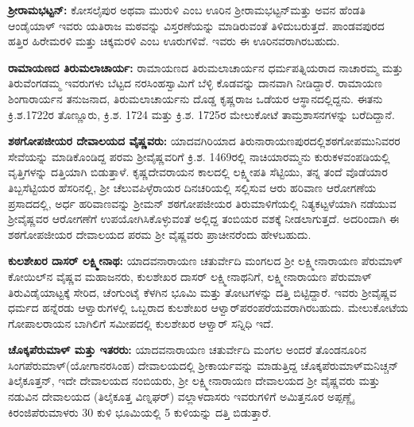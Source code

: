 \textbf{ಶ‍್ರೀರಾಮಭಟ್ಟನ್​:} ಕೋಸಲೈಪುರ ಅಥವಾ ಮುರುಳಿ ಎಂಬ ಊರಿನ ಶ‍್ರೀರಾಮಭಟ್ಟನ್​ ಮತ್ತು ಅವನ ಹೆಂಡತಿ ಆಂಡೈಯಾಳ್​ ಇವರು ಯತಿರಾಜ ಮಠವನ್ನು ವಿಸ್ತರಣೆಯನ್ನು ಮಾಡಿರುವಂತೆ ತಿಳಿದುಬರುತ್ತದೆ. ಪಾಂಡವಪುರದ ಹತ್ತಿರ ಹಿರೇಮರಳಿ ಮತ್ತು ಚಿಕ್ಕಮರಳಿ ಎಂಬ ಊರುಗಳಿವೆ. ಇವರು ಈ ಊರಿನವರಾಗಿರಬಹುದು.

\textbf{ರಾಮಾಯಣದ ತಿರುಮಲಾಚಾರ್ಯ:} ರಾಮಾಯಣದ ತಿರುಮಲಾಚಾರ್ಯನ ಧರ್ಮಪತ್ನಿಯರಾದ ನಾಚಾರಮ್ಮ ಮತ್ತು ತಿರುವೆಂಗಡಮ್ಮ ಇವರುಗಳು ಬೆಟ್ಟದ ನರಸಿಂಹಸ್ವಾಮಿಗೆ ಬೆಳ್ಳಿ ಕೊಡವನ್ನು ದಾನವಾಗಿ ನೀಡಿದ್ದಾರೆ. ರಾಮಾಯಣ ಶಿಂಗಾರಾರ್ಯನ ತನುಜನಾದ, ತಿರುಮಲಾಚಾರ್ಯನು ದೊಡ್ಡ ಕೃಷ್ಣರಾಜ ಒಡೆಯರ ಆಸ್ಥಾನದಲ್ಲಿದ್ದನು. ಈತನು ಕ್ರಿ.ಶ.1722ರ ತೊಣ್ಣೂರು, ಕ್ರಿ.ಶ. 1724 ಮತ್ತು ಕ್ರಿ.ಶ. 1725ರ ಮೇಲುಕೋಟೆ ತಾಮ್ರಶಾಸನಗಳನ್ನು ಬರೆದಿದ್ದಾನೆ.

\textbf{ಶಠಗೋಪಜೀಯರ ದೇವಾಲಯದ ವೈಷ್ಣವರು:} ಯಾದವಗಿರಿಯಾದ ತಿರುನಾರಾಯಣಪುರದಲ್ಲಿ\break ಶಠಗೋಪಮುನಿವರರ ಸೇವೆಯನ್ನು ಮಾಡಿಕೊಂಡಿದ್ದ ಪರಮ ಶ‍್ರೀವೈಷ್ಣವರಿಗೆ ಕ್ರಿ.ಶ. 1469ರಲ್ಲಿ ನಾಚಿಯಾರಮ್ಮನು ಕುರುಕಳವಂಪಡಿಯಲ್ಲಿ ವೃತ್ತಿಗಳನ್ನು ದತ್ತಿಯಾಗಿ ಬಿಡುತ್ತಾಳೆ. ಕೃಷ್ಣದೇವರಾಯನ ಕಾಲದಲ್ಲಿ ಲಕ್ಷ್ಮೀಪತಿ ಸೆಟ್ಟಿಯು, ತನ್ನ ತಂದೆ ವೊಡೆಯಾರ ತಿಬ್ಬಸೆಟ್ಟಿಯರ ಹೆಸರಿನಲ್ಲಿ, ಶ‍್ರೀ ಚೆಲುವಪಿಳ್ಳೆರಾಯರ ದಿನಚರಿಯಲ್ಲಿ ಸಲ್ಲಿಸುವ ಆರು ಹರಿವಾಣ ಆರೋಗಣೆಯ ಪ್ರಸಾದದಲ್ಲಿ, ಅರ್ಧ ಹರಿವಾಣವನ್ನು ಶ‍್ರೀಮನ್​ ಶಠಗೋಪಜೀಯರ ತಿರುಮಾಳಿಗೆಯಲ್ಲಿ ನಿತ್ಯಕಟ್ಟಳೆಯಾಗಿ ನಡೆಯುವ ಶ‍್ರೀವೈಷ್ಣವರ ಆರೋಗಣೆಗೆ ಉಪಯೋಗಿಸಿಕೊಳ್ಳುವಂತೆ ಅಲ್ಲಿದ್ದ ತಂಬಿಯರ ವಶಕ್ಕೆ ನೀಡಲಾಗುತ್ತದೆ. ಅದರಿಂದಾಗಿ ಈ ಶಠಗೋಪಜೀಯರ ದೇವಾಲಯದ ಪರಮ ಶ‍್ರೀ ವೈಷ್ಣವರು ಪ್ರಾಚೀನರೆಂದು ಹೇಳಬಹುದು.

\textbf{ಕುಲಶೇಖರ ದಾಸರ್​ ಲಕ್ಷ್ಮೀನಾಥ:} ಯಾದವನಾರಾಯಣ ಚತುರ್ವೇದಿ ಮಂಗಲದ ಶ‍್ರೀ ಲಕ್ಷ್ಮೀನಾರಾಯಣ ಪೆರುಮಾಳ್​ ಕೋಯಿಲ್​ನ ವೈಷ್ಣವ ಮಹಾಜನರು, ಕುಲಶೇಖರ ದಾಸರ್​ ಲಕ್ಷ್ಮೀನಾಥನಿಗೆ, ಲಕ್ಷ್ಮೀನಾರಾಯಣ ಪೆರುಮಾಳ್​ ತಿರುವಿಡೈಯಾಟ್ಟಕ್ಕೆ ಸೇರಿದ, ಚೆಂಗುಂಟೈ ಕೆಳಗಿನ ಭೂಮಿ ಮತ್ತು ತೋಟಗಳನ್ನು ದತ್ತಿ ಬಿಟ್ಟಿದ್ದಾರೆ. ಇವರು ಶ‍್ರೀವೈಷ್ಣವ ಧರ್ಮದ ಹನ್ನೆರಡು ಆಳ್ವಾರುಗಳಲ್ಲಿ ಒಬ್ಬರಾದ ಕುಲಶೇಖರ ಆಳ್ವಾರ್​ ಪರಂಪರೆಯವರಾಗಿರಬಹುದು. ಮೇಲುಕೋಟೆಯ ಗೋಪಾಲರಾಯನ ಬಾಗಿಲಿಗೆ ಸಮೀಪದಲ್ಲಿ ಕುಲಶೇಖರ ಆಳ್ವಾರ್​ ಸನ್ನಿಧಿ ಇದೆ.

\textbf{ಚೊಕ್ಕಪೆರುಮಾಳ್​ ಮತ್ತು ಇತರರು:} ಯಾದವನಾರಾಯಣ ಚತುರ್ವೇದಿ ಮಂಗಲ ಅಂದರೆ ತೊಂಡನೂರಿನ ಸಿಂಗಪೆರುಮಾಳ್​(ಯೋಗಾನರಸಿಂಹ) ದೇವಾಲಯದಲ್ಲಿ ಶ‍್ರೀಕಾರ್ಯವನ್ನು ಮಾಡುತ್ತಿದ್ದ ಚೊಕ್ಕಪೆರುಮಾಳ್​ ಮನಿಚ್ಚನ್​ ತಿಲೈಕೂತ್ತನ್​, ಇದೇ ದೇವಾಲಯದ ನಂಬಿಯರು, ಶ‍್ರೀ ಲಕ್ಷ್ಮೀನಾರಾಯಣ ದೇವಾಲಯದ ಶ‍್ರೀ ವೈಷ್ಣವರು ಮತ್ತು ನಡುವಿನ ದೇವಾಲಯದ (ತಿಲೈಕೂತ್ತ ವಿಣ್ನಘರ್​) ವಲ್ಲಾಳದಾಸರು ಇವರುಗಳಿಗೆ ಅಮಿತ್ತನೂರ ಅಪ್ಪಣ್ಣೈ ಕಿರಂಜಿಪೆರುಮಾಳರು 30 ಕುಳಿ ಭೂಮಿಯಲ್ಲಿ 5 ಕುಳಿಯನ್ನು ದತ್ತಿ ಬಿಡುತ್ತಾರೆ.


